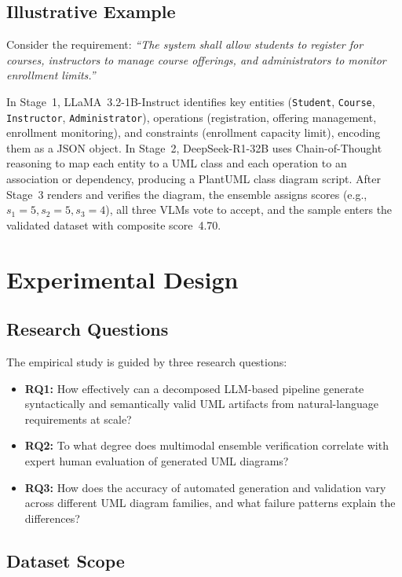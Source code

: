 \documentclass[conference]{IEEEtran}
\begin{document}
\subsection{Illustrative Example}

Consider the requirement: \textit{``The system shall allow students to
register for courses, instructors to manage course offerings, and
administrators to monitor enrollment limits.''}

In Stage~1, LLaMA~3.2-1B-Instruct identifies key entities
(\texttt{Student}, \texttt{Course}, \texttt{Instructor},
\texttt{Administrator}), operations (registration, offering
management, enrollment monitoring), and constraints (enrollment
capacity limit), encoding them as a JSON object. In Stage~2,
DeepSeek-R1-32B uses Chain-of-Thought reasoning to map each entity
to a UML class and each operation to an association or dependency,
producing a PlantUML class diagram script. After Stage~3 renders
and verifies the diagram, the ensemble assigns scores (e.g.,
$s_1=5, s_2=5, s_3=4$), all three VLMs vote to accept, and the
sample enters the validated dataset with composite score~4.70.

\section{Experimental Design}

\subsection{Research Questions}

The empirical study is guided by three research questions:
\begin{itemize}
  \item \textbf{RQ1:} How effectively can a decomposed LLM-based
    pipeline generate syntactically and semantically valid UML
    artifacts from natural-language requirements at scale?
  \item \textbf{RQ2:} To what degree does multimodal ensemble
    verification correlate with expert human evaluation of generated
    UML diagrams?
  \item \textbf{RQ3:} How does the accuracy of automated generation
    and validation vary across different UML diagram families, and
    what failure patterns explain the differences?
\end{itemize}

\subsection{Dataset Scope}
\end{document}
